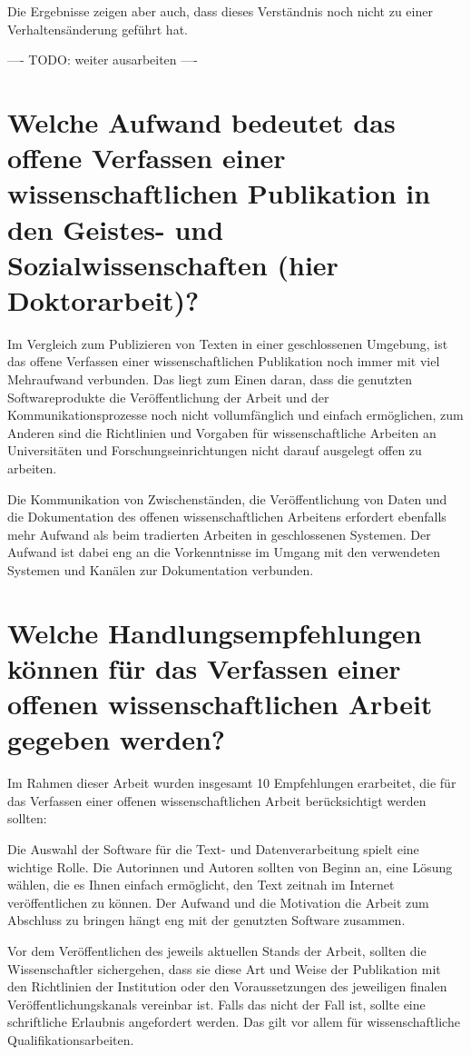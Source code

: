 Die Ergebnisse zeigen aber auch, dass dieses Verständnis noch nicht zu einer Verhaltensänderung geführt hat.

---- TODO: weiter ausarbeiten ----

\section{Welche Aufwand bedeutet das offene Verfassen einer wissenschaftlichen Publikation in den Geistes- und Sozialwissenschaften (hier Doktorarbeit)?}

Im Vergleich zum Publizieren von Texten in einer geschlossenen Umgebung, ist das offene Verfassen einer wissenschaftlichen Publikation noch immer mit viel Mehraufwand verbunden. Das liegt zum Einen daran, dass die genutzten Softwareprodukte die Veröffentlichung der Arbeit und der Kommunikationsprozesse noch nicht vollumfänglich und einfach ermöglichen, zum Anderen sind die Richtlinien und Vorgaben für wissenschaftliche Arbeiten an Universitäten und Forschungseinrichtungen nicht darauf ausgelegt offen zu arbeiten.

Die Kommunikation von Zwischenständen, die Veröffentlichung von Daten und die Dokumentation des offenen wissenschaftlichen Arbeitens erfordert ebenfalls mehr Aufwand als beim tradierten Arbeiten in geschlossenen Systemen. Der Aufwand ist dabei eng an die Vorkenntnisse im Umgang mit den verwendeten Systemen und Kanälen zur Dokumentation verbunden.

\section{Welche Handlungsempfehlungen können für das Verfassen einer offenen wissenschaftlichen Arbeit gegeben werden?}

Im Rahmen dieser Arbeit wurden insgesamt 10 Empfehlungen erarbeitet, die für das Verfassen einer offenen wissenschaftlichen Arbeit berücksichtigt werden sollten:

Die Auswahl der Software für die Text- und Datenverarbeitung spielt eine wichtige Rolle. Die Autorinnen und Autoren sollten von Beginn an, eine Lösung wählen, die es Ihnen einfach ermöglicht, den Text zeitnah im Internet veröffentlichen zu können. Der Aufwand und die Motivation die Arbeit zum Abschluss zu bringen hängt eng mit der genutzten Software zusammen.

Vor dem Veröffentlichen des jeweils aktuellen Stands der Arbeit, sollten die Wissenschaftler sichergehen, dass sie diese Art und Weise der Publikation mit den Richtlinien der Institution oder den Voraussetzungen des jeweiligen finalen Veröffentlichungskanals vereinbar ist. Falls das nicht der Fall ist, sollte eine schriftliche Erlaubnis angefordert werden. Das gilt vor allem für wissenschaftliche Qualifikationsarbeiten.

